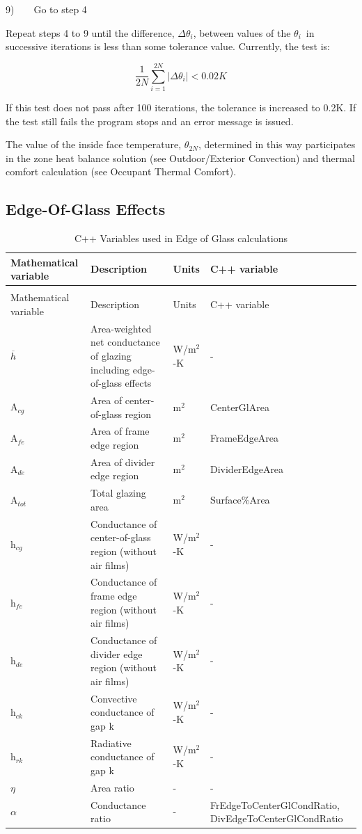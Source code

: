 9)~~~~Go to step 4

Repeat steps 4 to 9 until the difference, \(\Delta {\theta_i}\), between values of the \({\theta_i}\)~in successive iterations is less than some tolerance value. Currently, the test is:

\begin{equation}
\frac{1}{{2N}}\sum\limits_{i = 1}^{2N} {|\Delta {\theta_i}|{\mathrm{ }} < 0.02K}
\end{equation}

If this test does not pass after 100 iterations, the tolerance is increased to 0.2K. If the test still fails the program stops and an error message is issued.

The value of the inside face temperature, \({\theta_{2N}}\), determined in this way participates in the zone heat balance solution (see Outdoor/Exterior Convection) and thermal comfort calculation (see Occupant Thermal Comfort).

\subsection{Edge-Of-Glass Effects}\label{edge-of-glass-effects}

\begin{longtable}[c]{p{1.0in}p{2.5in}p{1.0in}p{1.5in}}
\caption{C++ Variables used in Edge of Glass calculations \label{table:c++-variables-used-in-edge-of-glass}} \tabularnewline
\toprule
Mathematical variable & Description & Units & C++ variable \tabularnewline
\midrule
\endfirsthead

\caption[]{C++ Variables used in Edge of Glass calculations} \tabularnewline
\toprule
Mathematical variable & Description & Units & C++ variable \tabularnewline
\midrule
\endhead

\(\overline h\) & Area-weighted net conductance of glazing including edge-of-glass effects & W/m\(^{2}\)-K & - \tabularnewline
A\(_{cg}\) & Area of center-of-glass region & m\(^{2}\) & CenterGlArea \tabularnewline
A\(_{fe}\) & Area of frame edge region & m\(^{2}\) & FrameEdgeArea \tabularnewline
A\(_{de}\) & Area of divider edge region & m\(^{2}\) & DividerEdgeArea \tabularnewline
A\(_{tot}\) & Total glazing area & m\(^{2}\) & Surface\%Area \tabularnewline
h\(_{cg}\) & Conductance of center-of-glass region (without air films) & W/m\(^{2}\)-K & - \tabularnewline
h\(_{fe}\) & Conductance of frame edge region (without air films) & W/m\(^{2}\)-K & - \tabularnewline
h\(_{de}\) & Conductance of divider edge region (without air films) & W/m\(^{2}\)-K & - \tabularnewline
h\(_{ck}\) & Convective conductance of gap k & W/m\(^{2}\)-K & - \tabularnewline
h\(_{rk}\) & Radiative conductance of gap k & W/m\(^{2}\)-K & - \tabularnewline
$\eta$ & Area ratio & - & - \tabularnewline
$\alpha$ & Conductance ratio & - & FrEdgeToCenterGlCondRatio, DivEdgeToCenterGlCondRatio \tabularnewline
\bottomrule
\end{longtable}

